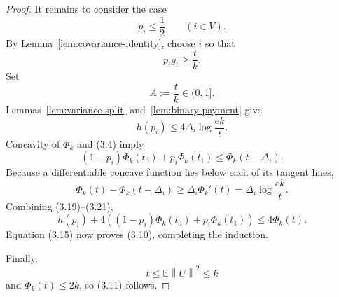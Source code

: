 \documentclass[10pt,a4paper]{amsart}
\newcommand{\E}{\mathbb E}
\newcommand{\norm}[1]{\left\lVert #1\right\rVert}
\begin{document}
\begin{proof}
It remains to consider the case
\[
 p_i\le\frac12\qquad(i\in V).
 \tag{3.18}
\]
By Lemma~\ref{lem:covariance-identity}, choose \(i\) so that
\[
 p_i g_i\ge\frac tk.
\]
Set
\[
 A:=\frac tk\in(0,1].
\]
Lemmas~\ref{lem:variance-split} and~\ref{lem:binary-payment} give
\[
 h(p_i)
 \le
 4\Delta_i\log\frac{ek}{t}.
 \tag{3.19}
\]
Concavity of \(\Phi_k\) and (3.4) imply
\[
 (1-p_i)\Phi_k(t_0)+p_i\Phi_k(t_1)
 \le
 \Phi_k(t-\Delta_i).
 \tag{3.20}
\]
Because a differentiable concave function lies below each of its tangent
lines,
\[
 \Phi_k(t)-\Phi_k(t-\Delta_i)
 \ge
 \Delta_i\Phi_k'(t)
 =
 \Delta_i\log\frac{ek}{t}.
 \tag{3.21}
\]
Combining (3.19)--(3.21),
\[
 h(p_i)
 +4\left(
      (1-p_i)\Phi_k(t_0)
      +p_i\Phi_k(t_1)
   \right)
 \le
 4\Phi_k(t).
\]
Equation (3.15) now proves (3.10), completing the induction.

Finally,
\[
 t\le\E\norm U^2\le k
\]
and \(\Phi_k(t)\le2k\), so (3.11) follows.
\end{proof}
\end{document}

